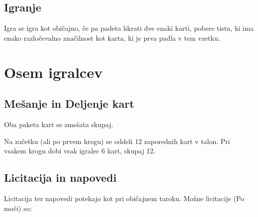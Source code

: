\documentclass[a4paper, ]{report}
\begin{document}
\chapter{Igranje}

Igra se igra kot običajno, če pa padeta hkrati dve enaki karti, pobere tista, ki ima enako razločevalno značilnost kot karta, ki je prva padla v tem vzetku.

\part{Osem igralcev}

\chapter{Mešanje in Deljenje kart}

Oba paketa kart se zmešata skupaj.

Na začetku (ali po prvem krogu) se oddeli 12 zaporednih kart v talon. Pri vsakem krogu dobi vsak igralec 6 kart, skupaj 12.

\chapter{Licitacija in napovedi}

Licitacija ter napovedi potekajo kot pri običajnem taroku.
Možne licitacije (Po moči) so:
\end{document}
